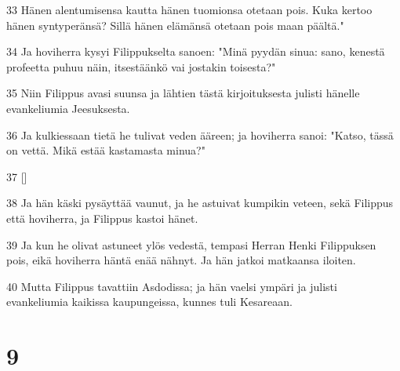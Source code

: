 \par 33 Hänen alentumisensa kautta hänen tuomionsa otetaan pois. Kuka kertoo hänen syntyperänsä? Sillä hänen elämänsä otetaan pois maan päältä."
\par 34 Ja hoviherra kysyi Filippukselta sanoen: "Minä pyydän sinua: sano, kenestä profeetta puhuu näin, itsestäänkö vai jostakin toisesta?"
\par 35 Niin Filippus avasi suunsa ja lähtien tästä kirjoituksesta julisti hänelle evankeliumia Jeesuksesta.
\par 36 Ja kulkiessaan tietä he tulivat veden ääreen; ja hoviherra sanoi: "Katso, tässä on vettä. Mikä estää kastamasta minua?"
\par 37 []
\par 38 Ja hän käski pysäyttää vaunut, ja he astuivat kumpikin veteen, sekä Filippus että hoviherra, ja Filippus kastoi hänet.
\par 39 Ja kun he olivat astuneet ylös vedestä, tempasi Herran Henki Filippuksen pois, eikä hoviherra häntä enää nähnyt. Ja hän jatkoi matkaansa iloiten.
\par 40 Mutta Filippus tavattiin Asdodissa; ja hän vaelsi ympäri ja julisti evankeliumia kaikissa kaupungeissa, kunnes tuli Kesareaan.

\chapter{9}

